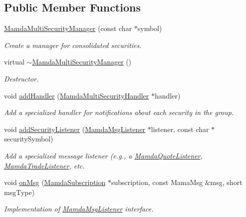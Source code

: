 \subsection*{Public Member Functions}
\begin{CompactItemize}
\item 
\hyperlink{classWombat_1_1MamdaMultiSecurityManager_80f97c60287c0e93b06a557b8ccd021b}{Mamda\-Multi\-Security\-Manager} (const char $\ast$symbol)
\begin{CompactList}\small\item\em Create a manager for consolidated securities. \item\end{CompactList}\item 
virtual \hyperlink{classWombat_1_1MamdaMultiSecurityManager_2e68188ad4b4b5a093771428fc5820b4}{$\sim$Mamda\-Multi\-Security\-Manager} ()
\begin{CompactList}\small\item\em Destructor. \item\end{CompactList}\item 
void \hyperlink{classWombat_1_1MamdaMultiSecurityManager_1a3afde9cf3c54cfc637a461346b3041}{add\-Handler} (\hyperlink{classWombat_1_1MamdaMultiSecurityHandler}{Mamda\-Multi\-Security\-Handler} $\ast$handler)
\begin{CompactList}\small\item\em Add a specialized handler for notifications about each security in the group. \item\end{CompactList}\item 
void \hyperlink{classWombat_1_1MamdaMultiSecurityManager_91699087725a9bfeadd57f3e958c3439}{add\-Security\-Listener} (\hyperlink{classWombat_1_1MamdaMsgListener}{Mamda\-Msg\-Listener} $\ast$listener, const char $\ast$security\-Symbol)
\begin{CompactList}\small\item\em Add a specialized message listener (e.g., a \hyperlink{classWombat_1_1MamdaQuoteListener}{Mamda\-Quote\-Listener}, \hyperlink{classWombat_1_1MamdaTradeListener}{Mamda\-Trade\-Listener}, etc. \item\end{CompactList}\item 
void \hyperlink{classWombat_1_1MamdaMultiSecurityManager_c850052340fb02a8c2485677fdc4cac9}{on\-Msg} (\hyperlink{classWombat_1_1MamdaSubscription}{Mamda\-Subscription} $\ast$subscription, const Mama\-Msg \&msg, short msg\-Type)
\begin{CompactList}\small\item\em Implementation of \hyperlink{classWombat_1_1MamdaMsgListener}{Mamda\-Msg\-Listener} interface. \item\end{CompactList}\end{CompactItemize}


